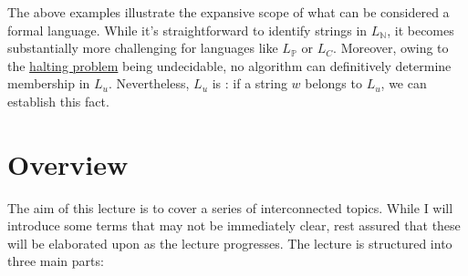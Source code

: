 The above examples illustrate the expansive scope of what can be considered a formal language. While it's
straightforward to identify strings in \( L_\mathbb{N} \), it becomes substantially more challenging for
languages like \( L_\mathbb{P} \) or \( L_C \). Moreover, owing to the
\href{https://en.wikipedia.org/wiki/Halting_problem}{halting problem} being undecidable, no algorithm can
definitively determine membership in \( L_u \). Nevertheless, \( L_u \) is : if a string
\( w \) belongs to \( L_u \), we can establish this fact.  

\section{Overview}
The aim of this lecture is to cover a series of interconnected topics. While I will introduce some terms that may not be immediately clear, rest assured that these will be elaborated upon as the lecture progresses. The lecture is structured into three main parts:

